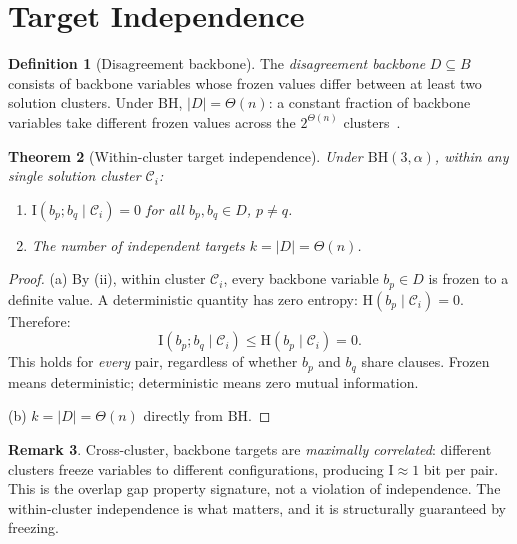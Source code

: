 \documentclass[11pt]{article}
\newtheorem{theorem}{Theorem}[section]
\theoremstyle{definition}
\newtheorem{definition}[theorem]{Definition}
\newtheorem{remark}[theorem]{Remark}
\newcommand{\MI}{\mathrm{I}}
\newcommand{\Ent}{\mathrm{H}}
\begin{document}
\section{Target Independence}\label{sec:blocks}

\begin{definition}[Disagreement backbone]\label{def:blocks}
The \emph{disagreement backbone} $D \subseteq B$ consists of backbone
variables whose frozen values differ between at least two solution
clusters.  Under $\mathrm{BH}$, $|D| = \Theta(n)$: a constant
fraction of backbone variables take different frozen values across the
$2^{\Theta(n)}$ clusters~\cite{AchlioptasCoja2008}.
\end{definition}

\begin{theorem}[Within-cluster target independence]\label{thm:block-indep}
Under $\mathrm{BH}(3, \alpha)$, within any single solution cluster
$\mathcal{C}_i$:
\begin{enumerate}[label=(\alph*)]
\item $\MI(b_p; b_q \mid \mathcal{C}_i) = 0$
for all $b_p, b_q \in D$, $p \neq q$.
\item The number of independent targets $k = |D| = \Theta(n)$.
\end{enumerate}
\end{theorem}

\begin{proof}
(a) By (ii), within cluster $\mathcal{C}_i$, every
backbone variable $b_p \in D$ is frozen to a definite value.  A
deterministic quantity has zero entropy:
$\Ent(b_p \mid \mathcal{C}_i) = 0$.  Therefore:
\[
\MI(b_p; b_q \mid \mathcal{C}_i)
\leq \Ent(b_p \mid \mathcal{C}_i) = 0.
\]
This holds for \emph{every} pair, regardless of whether $b_p$ and
$b_q$ share clauses.  Frozen means deterministic; deterministic
means zero mutual information.

(b) $k = |D| = \Theta(n)$ directly from $\mathrm{BH}$.
\end{proof}

\begin{remark}\label{rem:cross-cluster}
Cross-cluster, backbone targets are \emph{maximally correlated}:
different clusters freeze variables to different configurations,
producing $\MI \approx 1$ bit per pair.  This is the overlap gap
property signature, not a violation of independence.  The
within-cluster independence is what matters, and it is structurally
guaranteed by freezing.
\end{remark}
\end{document}
